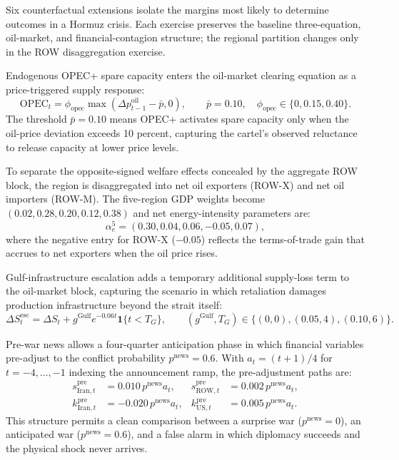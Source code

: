 \documentclass[12pt]{article}
\begin{document}
Six counterfactual extensions isolate the margins most likely to determine outcomes in a Hormuz crisis. Each exercise preserves the baseline three-equation, oil-market, and financial-contagion structure; the regional partition changes only in the ROW disaggregation exercise.

Endogenous OPEC+ spare capacity enters the oil-market clearing equation as a price-triggered supply response:
\begin{equation}
\text{OPEC}_t = \phi_{\text{opec}}\max(\Delta p^{\text{oil}}_{t-1}-\bar p,0),
\qquad \bar p = 0.10,\quad \phi_{\text{opec}}\in\{0,0.15,0.40\}.
\label{eq:opec_rule}
\end{equation}
The threshold $\bar p = 0.10$ means OPEC+ activates spare capacity only when the oil-price deviation exceeds 10 percent, capturing the cartel's observed reluctance to release capacity at lower price levels.

To separate the opposite-signed welfare effects concealed by the aggregate ROW block, the region is disaggregated into net oil exporters (ROW-X) and net oil importers (ROW-M). The five-region GDP weights become $(0.02, 0.28, 0.20, 0.12, 0.38)$ and net energy-intensity parameters are:
\begin{equation}
\alpha_e^{5}=(0.30,0.04,0.06,-0.05,0.07),
\label{eq:row_split_alpha}
\end{equation}
where the negative entry for ROW-X ($-0.05$) reflects the terms-of-trade gain that accrues to net exporters when the oil price rises.

Gulf-infrastructure escalation adds a temporary additional supply-loss term to the oil-market block, capturing the scenario in which retaliation damages production infrastructure beyond the strait itself:
\begin{equation}
\Delta S^{\text{esc}}_t=\Delta S_t+g^{\text{Gulf}}e^{-0.06t}\mathbf{1}\{t<T_G\},
\qquad (g^{\text{Gulf}},T_G)\in\{(0,0),(0.05,4),(0.10,6)\}.
\label{eq:escalation}
\end{equation}

Pre-war news allows a four-quarter anticipation phase in which financial variables pre-adjust to the conflict probability $p^{\text{news}}=0.6$. With $a_t=(t+1)/4$ for $t=-4,\ldots,-1$ indexing the announcement ramp, the pre-adjustment paths are:
\begin{equation}
\begin{aligned}
s^{\text{pre}}_{\text{Iran},t} &= 0.010\,p^{\text{news}}a_t, &
s^{\text{pre}}_{\text{ROW},t} &= 0.002\,p^{\text{news}}a_t, \\
k^{\text{pre}}_{\text{Iran},t} &= -0.020\,p^{\text{news}}a_t, &
k^{\text{pre}}_{\text{US},t} &= 0.005\,p^{\text{news}}a_t.
\end{aligned}
\label{eq:news}
\end{equation}
This structure permits a clean comparison between a surprise war ($p^{\text{news}}=0$), an anticipated war ($p^{\text{news}}=0.6$), and a false alarm in which diplomacy succeeds and the physical shock never arrives.
\end{document}
